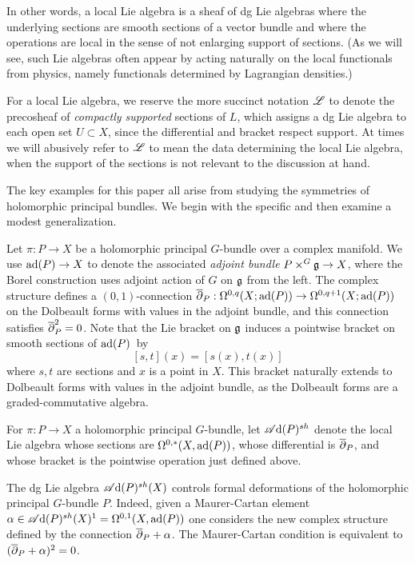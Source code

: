 In other words, a local Lie algebra is a sheaf of dg Lie algebras 
where the underlying sections are smooth sections of a vector bundle and 
where the operations are local in the sense of not enlarging support of sections. 
(As we will see, such Lie algebras often appear by acting naturally on the local functionals from physics, namely functionals determined by Lagrangian densities.)

\begin{rmk}
For a local Lie algebra, we reserve the more succinct notation $\mathscr L$ to denote the precosheaf of {\em compactly supported} sections of $L$,
which assigns a dg Lie algebra to each open set $U \subset X$, 
since the differential and bracket respect support.
At times we will abusively refer to $\mathscr L$ to mean the data determining the local Lie algebra,
when the support of the sections is not relevant to the discussion at hand.
\end{rmk}

The key examples for this paper all arise from studying the symmetries of holomorphic principal bundles.
We begin with the specific and then examine a modest generalization.

Let $\pi : P \to X$ be a holomorphic principal $G$-bundle over a complex manifold.
We use ${\rm ad}(P) \to X$ to denote the associated {\em adjoint bundle} $P \times^{G} \mathfrak g \to X$, 
where the Borel construction uses adjoint action of $G$ on $\mathfrak g$ from the left. 
The complex structure defines a $(0,1)$-connection $\overline{\partial}_P : \Omega^{0,q}(X ; {\rm ad}(P)) \to \Omega^{0,q+1}(X ; {\rm ad}(P))$
on the Dolbeault forms with values in the adjoint bundle,
and this connection satisfies $\overline{\partial}_P^2 = 0$.
Note that the Lie bracket on $\mathfrak g$ induces a pointwise bracket on smooth sections of ${\rm ad}(P)$~by
\[
[s,t](x) = [s(x),t(x)]
\]
where $s, t$ are sections and $x$ is a point in $X$.
This bracket naturally extends to Dolbeault forms with values in the adjoint bundle,
as the Dolbeault forms are a graded-commutative algebra.

\begin{dfn}\label{dfn: adjoint local}
For $\pi : P \to X$ a holomorphic principal $G$-bundle,
let $\mathscr A{\rm d}(P)^{sh}$ denote the local Lie algebra whose sections are $\Omega^{0,*}(X,{\rm ad}(P))$,
whose differential is $\overline{\partial}_P$, and whose bracket is the pointwise operation just defined above.
\end{dfn}

The dg Lie algebra $\mathscr A{\rm d}(P)^{sh}(X)$ controls formal deformations of the holomorphic principal $G$-bundle $P$. 
Indeed, given a Maurer-Cartan element $\alpha \in \mathscr A{\rm d}(P)^{sh}(X)^1 = \Omega^{0,1}(X, {\rm ad}(P))$ one considers the new complex structure defined by the connection $\overline{\partial}_P + \alpha$. 
The Maurer-Cartan condition is equivalent to $(\overline{\partial}_P + \alpha)^2 = 0$. 

